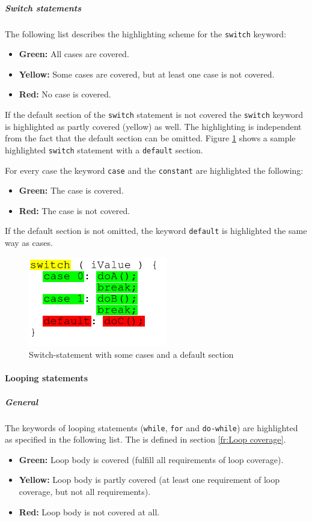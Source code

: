\subparagraph{Switch statements}
The following list describes the highlighting scheme for the \texttt{switch} keyword:
\begin{itemize}
\item \textbf{Green:}  All cases are covered.
\item \textbf{Yellow:}  Some cases are covered, but at least one case is not covered.
\item \textbf{Red:}  No case is covered.
\end{itemize}
If the default section of the \texttt{switch} statement is not covered the \texttt{switch} keyword is highlighted as partly covered (yellow) as well. The highlighting is independent from the fact that the default section can be omitted. Figure \ref{ui_fg:Switch-statement with some cases and default section} shows a sample highlighted \texttt{switch} statement with a \texttt{default} section.
\par
For every case the keyword \texttt{case} and the \texttt{constant} are highlighted the following:
\begin{itemize}
\item \textbf{Green:}  The case is covered.
\item \textbf{Red:}  The case is not covered.
\end{itemize}
If the default section is not omitted, the keyword \texttt{default} is highlighted the same way as cases.

\begin{figure}[hbt]
 \centering
 \includegraphics[]{images/Source_Code_Highlighting/switch/switch}
 \caption{Switch-statement with some cases and a default section}
 \label{ui_fg:Switch-statement with some cases and default section}
\end{figure}
\par
\par

\paragraph{Looping statements}
\subparagraph{General}
The keywords of looping statements (\texttt{while}, \texttt{for} and \texttt{do-while}) are highlighted as specified in the following list. The  is defined in section \ref{fr:Loop coverage}.
\begin{itemize}
\item \textbf{Green:}  Loop body is covered (fulfill all requirements of loop coverage). 
\item \textbf{Yellow:}  Loop body is partly covered (at least one requirement of loop coverage, but not all requirements).
\item \textbf{Red:}  Loop body is not covered at all.
\end{itemize}
\par

